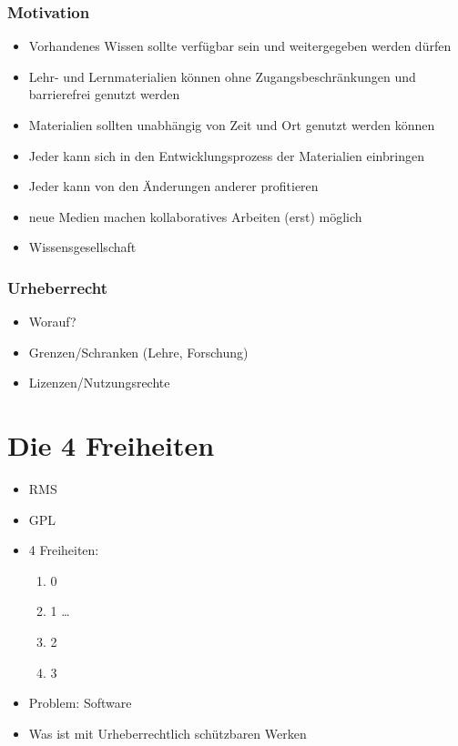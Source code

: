 \documentclass{beamer}
\begin{document}
\begin{frame}
    \frametitle{Motivation}
    \begin{itemize}
        \item<2-> Vorhandenes Wissen sollte verfügbar sein und weitergegeben werden dürfen
        \item<3-> Lehr- und Lernmaterialien können ohne Zugangsbeschränkungen und barrierefrei genutzt werden
        \item<4-> Materialien sollten unabhängig von Zeit und Ort genutzt werden können
        \item<5-> Jeder kann sich in den Entwicklungsprozess der Materialien einbringen
        \item<6-> Jeder kann von den Änderungen anderer profitieren
        \item<7-> neue Medien machen kollaboratives Arbeiten (erst) möglich
        \item<8-> Wissensgesellschaft
    \end{itemize}
\end{frame}

\begin{frame}
    \frametitle{Urheberrecht}
    \begin{itemize}
        \item<2-> Worauf?
        \item<3-> Grenzen/Schranken (Lehre, Forschung)
        \item<4-> Lizenzen/Nutzungsrechte
    \end{itemize}
\end{frame}

\section{Die 4 Freiheiten}
\begin{itemize}
    \item<2-> RMS
    \item<3-> GPL
    \item<4-> 4 Freiheiten:
        \begin{enumerate}\setcounter{enumi}{0}
            \item<2-> 0
            \item<2-> 1 \ldots
            \item<2-> 2
            \item<2-> 3
        \end{enumerate}
    \item<5-> Problem: Software
    \item<6-> Was ist mit Urheberrechtlich schützbaren Werken
\end{itemize}
\end{document}
